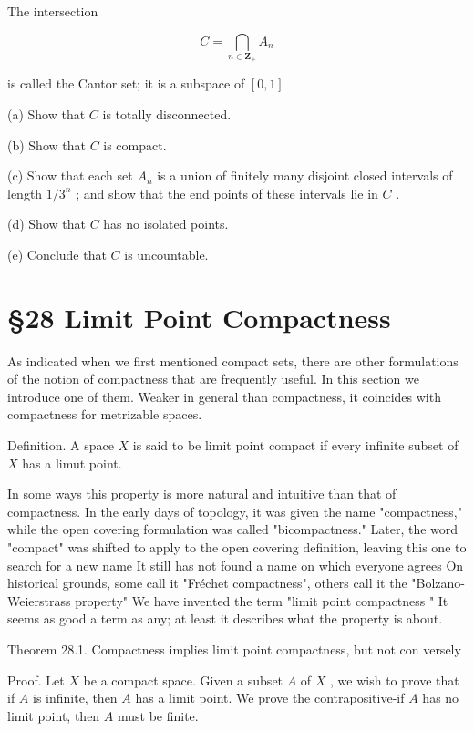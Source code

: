 \documentclass[10pt]{article}
\begin{document}
The intersection

\[
C = \mathop{\bigcap }\limits_{{n \in  {\mathbf{Z}}_{ + }}}{A}_{n}
\]

is called the Cantor set; it is a subspace of \(\left\lbrack  {0,1}\right\rbrack\)

(a) Show that \(C\) is totally disconnected.

(b) Show that \(C\) is compact.

(c) Show that each set \({A}_{n}\) is a union of finitely many disjoint closed intervals of length \(1/{3}^{n}\) ; and show that the end points of these intervals lie in \(C\) .

(d) Show that \(C\) has no isolated points.

(e) Conclude that \(C\) is uncountable.

\section*{§28 Limit Point Compactness}

As indicated when we first mentioned compact sets, there are other formulations of the notion of compactness that are frequently useful. In this section we introduce one of them. Weaker in general than compactness, it coincides with compactness for metrizable spaces.

Definition. A space \(X\) is said to be limit point compact if every infinite subset of \(X\) has a limut point.

In some ways this property is more natural and intuitive than that of compactness. In the early days of topology, it was given the name "compactness," while the open covering formulation was called "bicompactness." Later, the word "compact" was shifted to apply to the open covering definition, leaving this one to search for a new name It still has not found a name on which everyone agrees On historical grounds, some call it "Fréchet compactness", others call it the "Bolzano-Weierstrass property" We have invented the term "limit point compactness " It seems as good a term as any; at least it describes what the property is about.

Theorem 28.1. Compactness implies limit point compactness, but not con versely

Proof. Let \(X\) be a compact space. Given a subset \(A\) of \(X\) , we wish to prove that if \(A\) is infinite, then \(A\) has a limit point. We prove the contrapositive-if \(A\) has no limit point, then \(A\) must be finite.
\end{document}
